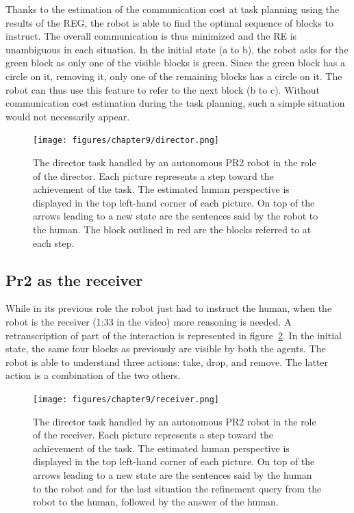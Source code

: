 Thanks to the estimation of the communication cost at task planning using the results of the REG, the robot is able to find the optimal sequence of blocks to instruct. The overall communication is thus minimized and the RE is unambiguous in each situation. In the initial state (a to b), the robot asks for the green block as only one of the visible blocks is green. Since the green block has a circle on it, removing it, only one of the remaining blocks has a circle on it. The robot can thus use this feature to refer to the next block (b to c). Without communication cost estimation during the task planning, such a simple situation would not necessarily appear.

\begin{figure}[ht!]
\centering
\texttt{[image: figures/chapter9/director.png]}
\caption{\label{fig:chap9_director} The director task handled by an autonomous PR2 robot in the role of the director. Each picture represents a step toward the achievement of the task. The estimated human perspective is displayed in the top left-hand corner of each picture. On top of the arrows leading to a new state are the sentences said by the robot to the human. The block outlined in red are the blocks referred to at each step. }
\end{figure}

\subsection{Pr2 as the receiver}

While in its previous role the robot just had to instruct the human, when the robot is the receiver (1:33 in the video) more reasoning is needed. A retranscription of part of the interaction is represented in figure~\ref{fig:chap9_receiver}. In the initial state, the same four blocks as previously are visible by both the agents. The robot is able to understand three actions: take, drop, and remove. The latter action is a combination of the two others.

\begin{figure}[ht!]
\centering
\texttt{[image: figures/chapter9/receiver.png]}
\caption{\label{fig:chap9_receiver} The director task handled by an autonomous PR2 robot in the role of the receiver. Each picture represents a step toward the achievement of the task. The estimated human perspective is displayed in the top left-hand corner of each picture. On top of the arrows leading to a new state are the sentences said by the human to the robot and for the last situation the refinement query from the robot to the human, followed by the answer of the human. }
\end{figure}

